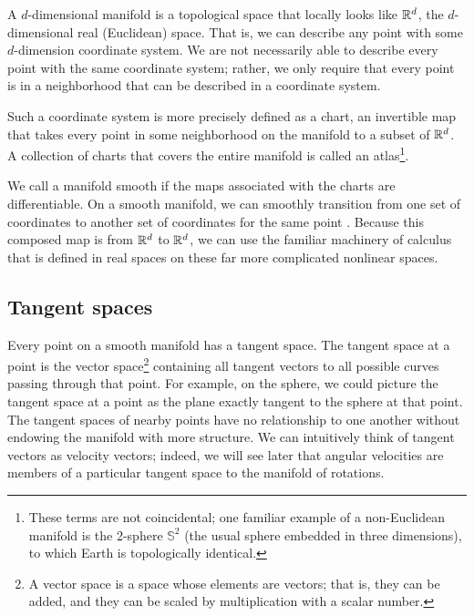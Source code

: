 \documentclass[../../main.tex]{subfiles}
\begin{document}
\begin{refsection}
	A $d$-dimensional manifold is a topological space that locally looks like $\mathbb{R}^d$, the $d$-dimensional real (Euclidean) space.
	That is, we can describe any point with some $d$-dimension coordinate system.
	We are not necessarily able to describe every point with the same coordinate system;
	rather, we only require that every point is in a neighborhood that can be described in a coordinate system.

	Such a coordinate system is more precisely defined as a chart, an invertible map that takes every point in some neighborhood on the manifold to a subset of $\mathbb{R}^d$.
	A collection of charts that covers the entire manifold is called an atlas\footnote{
		These terms are not coincidental;
		one familiar example of a non-Euclidean manifold is the 2-sphere $\mathbb{S}^2$ (the usual sphere embedded in three dimensions), to which Earth is topologically identical.}.

	We call a manifold smooth if the maps associated with the charts are differentiable.
	On a smooth manifold, we can smoothly transition from one set of coordinates to another set of coordinates for the same point \supercite{leeIntroductionSmoothManifolds2003}.
	Because this composed map is from $\mathbb{R}^d$ to $\mathbb{R}^d$, we can use the familiar machinery of calculus that is defined in real spaces on these far more complicated nonlinear spaces.

	\subsection{Tangent spaces}\label{tangent-spaces}

	Every point on a smooth manifold has a tangent space.
	The tangent space at a point is the vector space\footnote{
		A vector space is a space whose elements are vectors; that is, they can be added, and they can be scaled by multiplication with a scalar number.}
	containing all tangent vectors to all possible curves passing through that point.
	For example, on the sphere, we could picture the tangent space at a point as the plane exactly tangent to the sphere at that point.
	The tangent spaces of nearby points have no relationship to one another without endowing the manifold with more structure.
	We can intuitively think of tangent vectors as velocity vectors; indeed, we will see later that angular velocities are members of a particular tangent space to the manifold of rotations.


\end{refsection}
\end{document}
